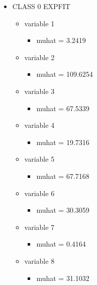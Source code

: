 \documentclass[a4paper]{article}
\begin{document}
\begin{itemize}
    \item CLASS 0 EXPFIT
    \begin{itemize}
        \item variable 1
        \begin{itemize}
            \item muhat = 3.2419
        \end{itemize}
        \item variable 2
        \begin{itemize}
            \item muhat = 109.6254
        \end{itemize}
        \item variable 3
        \begin{itemize}
            \item muhat = 67.5339
        \end{itemize}
        \item variable 4
        \begin{itemize}
            \item muhat = 19.7316
        \end{itemize}
        \item variable 5
        \begin{itemize}
            \item muhat = 67.7168
        \end{itemize}
        \item variable 6
        \begin{itemize}
            \item muhat = 30.3059
        \end{itemize}
        \item variable 7
        \begin{itemize}
            \item muhat = 0.4164
        \end{itemize}
        \item variable 8
        \begin{itemize}
            \item muhat = 31.1032
        \end{itemize}
    \end{itemize}
    

\end{itemize}
\end{document}
